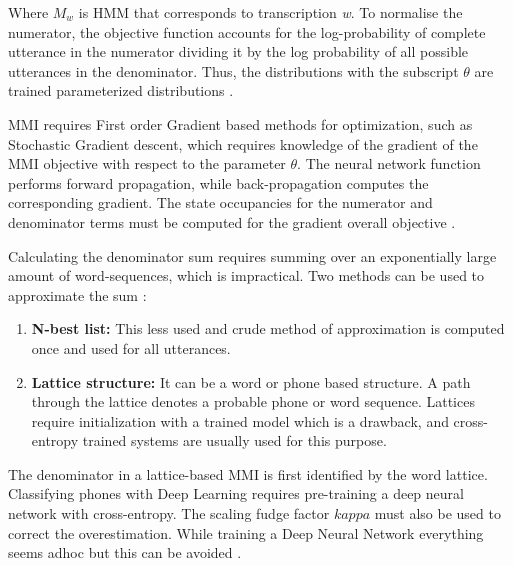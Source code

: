 Where $M_{w}$ is HMM that corresponds to transcription \textit{w}. To normalise the numerator, the objective function accounts for the log-probability of complete utterance in the numerator dividing it by the log probability of all possible utterances in the denominator. Thus, the distributions with the subscript $\theta$ are trained parameterized distributions \cite{wiesner_lattice_2020}.


MMI requires First order Gradient based methods for optimization, such as Stochastic Gradient descent, which requires knowledge of the gradient of the MMI objective with respect to the parameter $\theta$. The neural network function performs forward propagation, while back-propagation computes the corresponding gradient. The state occupancies for the numerator and denominator terms must be computed for the gradient overall objective \cite{daniel_povey_kaldi_nodate}.

Calculating the denominator sum requires summing over an exponentially large amount of word-sequences, which is impractical. Two methods can be used to approximate the sum \cite{noauthor_lattice_nodate}:

\begin{enumerate}
    \item \textbf{N-best list:} This less used and crude method of approximation is computed once and used for all utterances. 
    \item \textbf{Lattice structure:} It can be a word or phone based structure. A path through the lattice denotes a probable phone or word sequence. Lattices require initialization with a trained model which is a drawback, and cross-entropy trained systems are usually used for this purpose. 
\end{enumerate}


The denominator in a lattice-based MMI is first identified by the word lattice. Classifying phones with Deep Learning requires pre-training a deep neural network with cross-entropy. The scaling fudge factor $kappa$ must also be used to correct the overestimation. While training a Deep Neural Network everything seems adhoc but this can be avoided \cite{wiesner_lattice_2020}.

